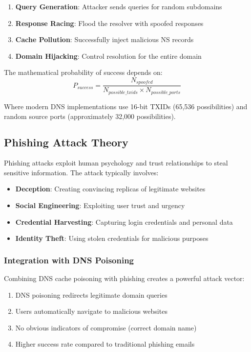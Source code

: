 \documentclass[12pt,a4paper]{article}
\begin{document}
\begin{enumerate}
    \item \textbf{Query Generation}: Attacker sends queries for random subdomains
    \item \textbf{Response Racing}: Flood the resolver with spoofed responses
    \item \textbf{Cache Pollution}: Successfully inject malicious NS records
    \item \textbf{Domain Hijacking}: Control resolution for the entire domain
\end{enumerate}

The mathematical probability of success depends on:
$$P_{success} = \frac{N_{spoofed}}{N_{possible\_txids} \times N_{possible\_ports}}$$

Where modern DNS implementations use 16-bit TXIDs (65,536 possibilities) and random source ports (approximately 32,000 possibilities).

\subsection{Phishing Attack Theory}

Phishing attacks exploit human psychology and trust relationships to steal sensitive information. The attack typically involves:

\begin{itemize}
    \item \textbf{Deception}: Creating convincing replicas of legitimate websites
    \item \textbf{Social Engineering}: Exploiting user trust and urgency
    \item \textbf{Credential Harvesting}: Capturing login credentials and personal data
    \item \textbf{Identity Theft}: Using stolen credentials for malicious purposes
\end{itemize}

\subsubsection{Integration with DNS Poisoning}

Combining DNS cache poisoning with phishing creates a powerful attack vector:
\begin{enumerate}
    \item DNS poisoning redirects legitimate domain queries
    \item Users automatically navigate to malicious websites
    \item No obvious indicators of compromise (correct domain name)
    \item Higher success rate compared to traditional phishing emails
\end{enumerate}
\end{document}
